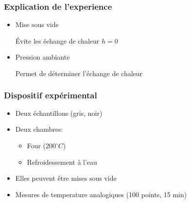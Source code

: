 \documentclass{beamer}
\begin{document}
\begin{frame}
\frametitle{Explication de l'experience}

\begin{itemize}

	\item{Mise sous vide}
    
    Évite les échange de chaleur $h=0$
    
	\item{Pression ambiante}
    
    Permet de déterminer l'échange de chaleur



	
\end{itemize}

\end{frame}



\begin{frame}
\frametitle{Dispositif expérimental}

\begin{itemize}
	\item{Deux échantillons (gris, noir)\newline}
	\item{Deux chambres:\newline
	\begin{itemize}
		\item{Four ($200^{\circ}C$)\newline}
		\item{Refroidessement à l'eau\newline}
	\end{itemize}}
	\item{Elles peuvent être mises sous vide\newline}
	\item{Mesures de temperature analogiques (100 points, 15 min)}
\end{itemize}
\end{frame}
\end{document}
